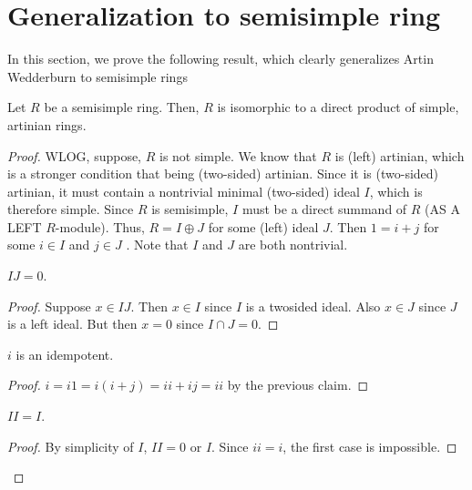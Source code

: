 \section{Generalization to semisimple ring}
In this section, we prove the following result, which clearly generalizes Artin Wedderburn to semisimple rings
\begin{theorem}
  \label{thm:semisimple_direct_product_simple_artinian}
  \leanok
  Let $R$ be a semisimple ring. Then, $R$ is isomorphic to a direct product of simple, artinian rings.
\end{theorem}
\begin{proof}
  \leanok
  WLOG, suppose, $R$ is not simple. We know that $R$ is (left) artinian, which is a stronger condition that being (two-sided) artinian. Since it is (two-sided) artinian, it must contain a nontrivial minimal (two-sided) ideal $I$, which is therefore simple. Since $R$ is semisimple, $I$ must be a direct summand of $R$ (AS A LEFT $R$-module). Thus, $R = I \oplus J$ for some (left) ideal $J$. Then $1 = i + j$ for some $i \in I$ and $j \in J$ . Note that $I$ and $J$ are both nontrivial.
  \begin{claim}
    $I J = 0$.
  \end{claim}
  \begin{proof}
    \leanok
    Suppose $x \in I J$. Then $x \in I$ since $I$ is a twosided ideal. Also $x \in J$ since $J$ is a left ideal. But then $x = 0$ since $I \cap J = 0$.
  \end{proof}

  \begin{claim}
    $i$ is an idempotent.
  \end{claim}
  \begin{proof}
    \leanok
    \uses{} %
    $i = i 1 = i(i + j) = i i + i j = i i$ by the previous claim.
  \end{proof}

  \begin{claim}
    $I I = I$.
  \end{claim}
  \begin{proof}
    \leanok
    By simplicity of $I$, $I I = 0$ or $I$. Since $ i i = i$, the first case is impossible.
  \end{proof}


\end{proof}
